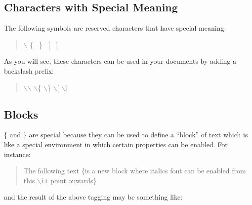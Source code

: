 \documentclass[11pt]{article}
\newcommand{\cmd}[1]{{\tt $\backslash$#1}}
\begin{document}




\subsection{Characters with Special Meaning}

The following symbols are reserved characters that have special
meaning:
\begin{quote}
$\backslash$ \hspace{0.25cm} \{\  \hspace{0.25cm} \}\ \hspace{0.25cm}  [\  \hspace{0.25cm} ]
\end{quote}
\noindent As you will see, these characters can be used in your documents
by adding a backslash prefix:
\begin{quote}

$\backslash$$\backslash$ \hspace{0.25cm} $\backslash$\{ \hspace{0.25cm} $\backslash$\} \hspace{0.25cm} $\backslash$[ \hspace{0.25cm} $\backslash$]
\end{quote}

\subsection{Blocks}

\noindent \{ and \} are special because they can be used to define a ``block''
of text which is like a special environment in which certain
properties can be enabled. For instance:

\begin{quote}
The following text \{is a new block where italics font can be enabled
from this \cmd{it} point onwards\}
\end{quote}

\noindent and the result of the above tagging may be something like:
\end{document}
